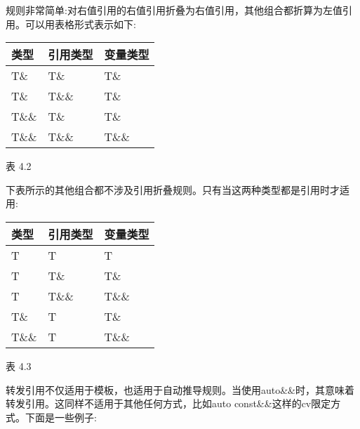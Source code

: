 规则非常简单:对右值引用的右值引用折叠为右值引用，其他组合都折算为左值引用。可以用表格形式表示如下:

\begin{table}[H]
\centering
	\begin{tabular}{|l|l|l|}
		\hline
		\textbf{类型} & \textbf{引用类型} & \textbf{变量类型} \\ \hline
		T\&           & T\&                        & T\&                       \\ \hline
		T\&           & T\&\&                      & T\&                       \\ \hline
		T\&\&         & T\&                        & T\&                       \\ \hline
		T\&\&         & T\&\&                      & T\&\&                     \\ \hline
	\end{tabular}
\end{table}

\begin{center}
表 4.2
\end{center}

下表所示的其他组合都不涉及引用折叠规则。只有当这两种类型都是引用时才适用:

\begin{table}[H]
\centering
	\begin{tabular}{|l|l|l|}
		\hline
		\textbf{类型} & \textbf{引用类型} & \textbf{变量类型} \\ \hline
		T             & T                          & T                         \\ \hline
		T             & T\&                        & T\&                       \\ \hline
		T             & T\&\&                      & T\&\&                     \\ \hline
		T\&           & T                          & T\&                       \\ \hline
		T\&\&         & T                          & T\&\&                     \\ \hline
	\end{tabular}
\end{table}

\begin{center}
表 4.3
\end{center}

转发引用不仅适用于模板，也适用于自动推导规则。当使用auto\&\&时，其意味着转发引用。这同样不适用于其他任何方式，比如auto const\&\&这样的cv限定方式。下面是一些例子:

